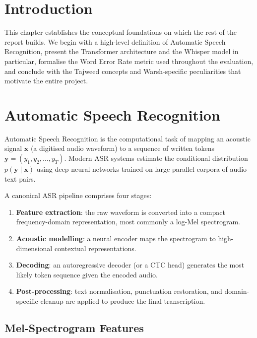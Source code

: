 \section{Introduction}
This chapter establishes the conceptual foundations on which the rest of the
report builds. We begin with a high-level definition of Automatic Speech
Recognition, present the Transformer architecture and the Whisper model in
particular, formalise the Word Error Rate metric used throughout the
evaluation, and conclude with the Tajweed concepts and Warsh-specific
peculiarities that motivate the entire project.

\section{Automatic Speech Recognition}
\label{sec:mt_asr}

\begin{emeraldbox}[title=Automatic Speech Recognition (ASR)]
Automatic Speech Recognition is the computational task of mapping an
acoustic signal $\mathbf{x}$ (a digitised audio waveform) to a sequence of
written tokens $\mathbf{y} = (y_1, y_2, \dots, y_T)$. Modern ASR systems
estimate the conditional distribution $p(\mathbf{y}\mid\mathbf{x})$ using
deep neural networks trained on large parallel corpora of audio--text
pairs.
\end{emeraldbox}

A canonical ASR pipeline comprises four stages:

\begin{enumerate}
  \item \textbf{Feature extraction}: the raw waveform is converted into a
        compact frequency-domain representation, most commonly a log-Mel
        spectrogram.
  \item \textbf{Acoustic modelling}: a neural encoder maps the spectrogram
        to high-dimensional contextual representations.
  \item \textbf{Decoding}: an autoregressive decoder (or a CTC head)
        generates the most likely token sequence given the encoded audio.
  \item \textbf{Post-processing}: text normalisation, punctuation
        restoration, and domain-specific cleanup are applied to produce the
        final transcription.
\end{enumerate}

\subsection{Mel-Spectrogram Features}

